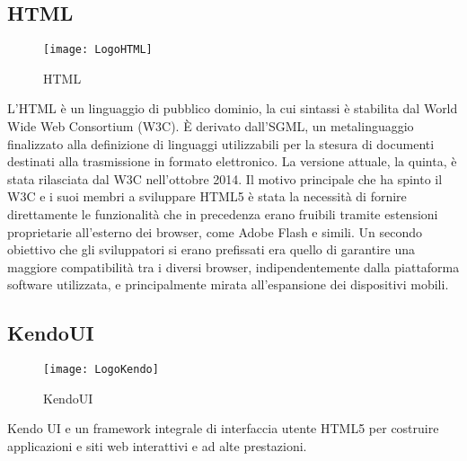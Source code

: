 \subsection{HTML}
\begin{figure}[htpb!]
\center
  \texttt{[image: LogoHTML]}
  \caption{HTML}
\end{figure}
L'HTML è un linguaggio di pubblico dominio, la cui sintassi è stabilita dal World Wide Web Consortium (W3C). È derivato dall'SGML, un metalinguaggio finalizzato alla definizione di linguaggi utilizzabili per la stesura di documenti destinati alla trasmissione in formato elettronico. La versione attuale, la quinta, è stata rilasciata dal W3C nell'ottobre 2014. Il motivo principale che ha spinto il W3C e i suoi membri a sviluppare HTML5 è stata la necessità di fornire direttamente le funzionalità che in precedenza erano fruibili tramite estensioni proprietarie all'esterno dei browser, come Adobe Flash e simili. Un secondo obiettivo che gli sviluppatori si erano prefissati era quello di garantire una maggiore compatibilità tra i diversi browser, indipendentemente dalla piattaforma software utilizzata, e principalmente mirata all'espansione dei dispositivi mobili.
\subsection{KendoUI}
\begin{figure}[htpb!]
\center
  \texttt{[image: LogoKendo]}
  \caption{KendoUI}
\end{figure}
Kendo UI e un framework integrale di interfaccia utente HTML5 per costruire applicazioni e siti web interattivi e ad alte prestazioni.
